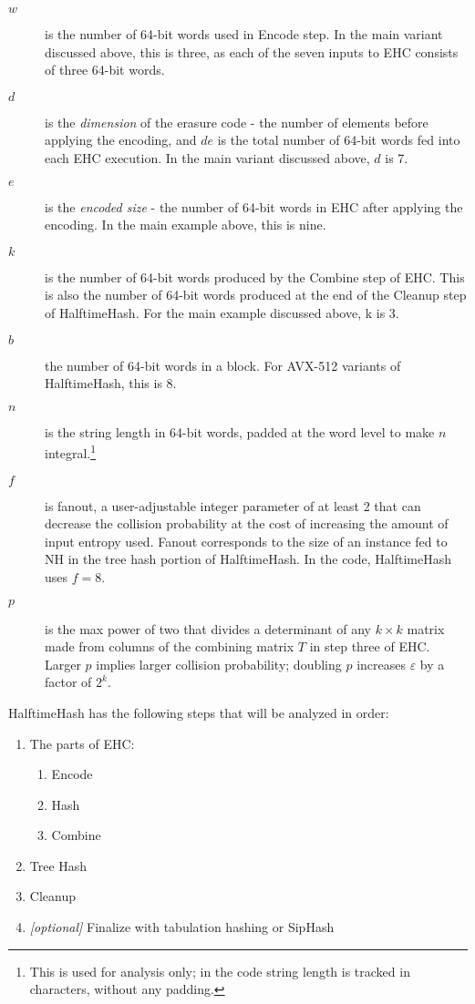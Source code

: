 \documentclass[sigconf, nonacm]{acmart}
\begin{document}
\begin {description}
\item[$w$] is the number of 64-bit words used in Encode step.
  In the main variant discussed above, this is three, as each of the seven inputs to EHC consists of three 64-bit words.
\item[$d$] is the {\em dimension} of the erasure code - the number of elements before applying the encoding, and $d e$ is the total number of 64-bit words fed into each EHC execution.
  In the main variant discussed above, $d$ is 7.
\item[$e$] is the {\em encoded size} - the number of 64-bit words in EHC after applying the encoding.
  In the main example above, this is nine.
\item[$k$] is the number of 64-bit words produced by the Combine step of EHC.
  This is also the number of 64-bit words produced at the end of the Cleanup step of HalftimeHash.
  For the main example discussed above, k is 3.
\item[$b$] the number of 64-bit words in a block.
  For AVX-512 variants of HalftimeHash, this is 8.
\item[$n$] is the string length in 64-bit words, padded at the word level to make $n$ integral.\footnote{This is used for analysis only; in the code string length is tracked in characters, without any padding.}
\item[$f$] is fanout, a user-adjustable integer parameter of at least 2 that can decrease the collision probability at the cost of increasing the amount of input entropy used.
  Fanout corresponds to the size of an instance fed to NH in the tree hash portion of HalftimeHash.
  In the code, HalftimeHash uses $f = 8$.
\item[$p$] is the max power of two that divides a determinant of any $k \times k$ matrix made from columns of the combining matrix $T$ in step three of EHC.
  Larger $p$ implies larger collision probability; doubling $p$ increases $\varepsilon$ by a factor of $2^k$.
\end{description}

HalftimeHash has the following steps that will be analyzed in order:

\begin{enumerate}
\item The parts of EHC:
  \begin {enumerate}
  \item Encode
  \item Hash
  \item Combine
  \end{enumerate}
\item Tree Hash
\item Cleanup
\item{} {\em [optional]} Finalize with tabulation hashing or SipHash
\end{enumerate}
\end{document}
